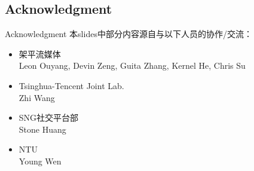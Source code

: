 \documentclass{beamer}
\begin{document}
\subsection{Acknowledgment}
\begin{frame}{Acknowledgment}
本slides中部分内容源自与以下人员的协作/交流：
\begin{itemize}
\item 架平流媒体\\
Leon Ouyang, Devin Zeng, Guita Zhang, Kernel He, Chris Su
\item Tsinghua-Tencent Joint Lab.\\ 
Zhi Wang
\item SNG社交平台部\\
Stone Huang
\item NTU\\
Young Wen
\end{itemize}
\end{frame}
\end{document}

